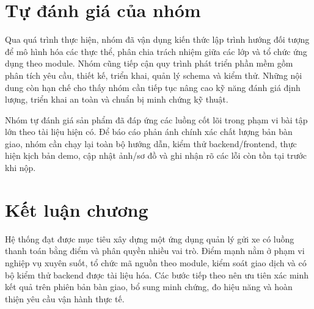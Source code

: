 \section{Tự đánh giá của nhóm}

Qua quá trình thực hiện, nhóm đã vận dụng kiến thức lập trình hướng đối tượng để mô hình hóa các thực thể, phân chia trách nhiệm giữa các lớp và tổ chức ứng dụng theo module. Nhóm cũng tiếp cận quy trình phát triển phần mềm gồm phân tích yêu cầu, thiết kế, triển khai, quản lý schema và kiểm thử. Những nội dung còn hạn chế cho thấy nhóm cần tiếp tục nâng cao kỹ năng đánh giá định lượng, triển khai an toàn và chuẩn bị minh chứng kỹ thuật.

Nhóm tự đánh giá sản phẩm đã đáp ứng các luồng cốt lõi trong phạm vi bài tập lớn theo tài liệu hiện có. Để báo cáo phản ánh chính xác chất lượng bản bàn giao, nhóm cần chạy lại toàn bộ hướng dẫn, kiểm thử backend/frontend, thực hiện kịch bản demo, cập nhật ảnh/sơ đồ và ghi nhận rõ các lỗi còn tồn tại trước khi nộp.

\section{Kết luận chương}

Hệ thống đạt được mục tiêu xây dựng một ứng dụng quản lý gửi xe có luồng thanh toán bằng điểm và phân quyền nhiều vai trò. Điểm mạnh nằm ở phạm vi nghiệp vụ xuyên suốt, tổ chức mã nguồn theo module, kiểm soát giao dịch và có bộ kiểm thử backend được tài liệu hóa. Các bước tiếp theo nên ưu tiên xác minh kết quả trên phiên bản bàn giao, bổ sung minh chứng, đo hiệu năng và hoàn thiện yêu cầu vận hành thực tế.
